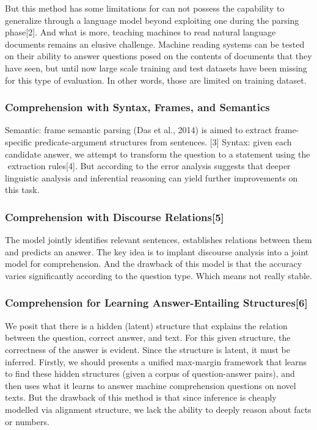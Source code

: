 \documentclass[runningheads,a4paper]{llncs}
\begin{document}

But this method has some limitations for can not possess the capability to generalize through a language model beyond exploiting one during the parsing phase[2]. And what is more, teaching machines to read natural language documents remains an elusive challenge. Machine reading systems can be tested on their ability to answer questions posed on the contents of documents that they have seen, but until now large scale training and test datasets have been missing for this type of evaluation. In other words, those are limited on training dataset.

\subsubsection*{ Comprehension with Syntax, Frames, and Semantics}
Semantic: frame semantic parsing (Das et al., 2014) is aimed to extract frame-specific predicate-argument structures from sentences. [3]
Syntax: given each candidate answer, we attempt to transform the question to a statement using the  extraction rules[4].
But according to the error analysis suggests that deeper linguistic analysis and inferential reasoning can yield further improvements on this task.


\subsubsection*{ Comprehension with Discourse Relations[5]}
The model jointly identifies relevant sentences, establishes relations between them and predicts an answer. The key idea is to implant discourse analysis into a joint model for comprehension. And the drawback of this model is that the accuracy varies significantly according to the question type. Which means not really stable. 

\subsubsection*{  Comprehension for Learning Answer-Entailing Structures[6]}
We posit that there is a hidden (latent) structure that explains the relation between the question, correct answer, and text. For this given structure, the correctness of the answer is evident. Since the structure is latent, it must be inferred. Firstly, we should presents a unified max-margin framework that learns to find these hidden structures (given a corpus of question-answer pairs), and then uses what it learns to answer machine comprehension questions on novel texts. But the drawback of this method is that since inference is cheaply modelled via alignment structure, we lack the ability to deeply reason about facts or numbers. 
\end{document}
